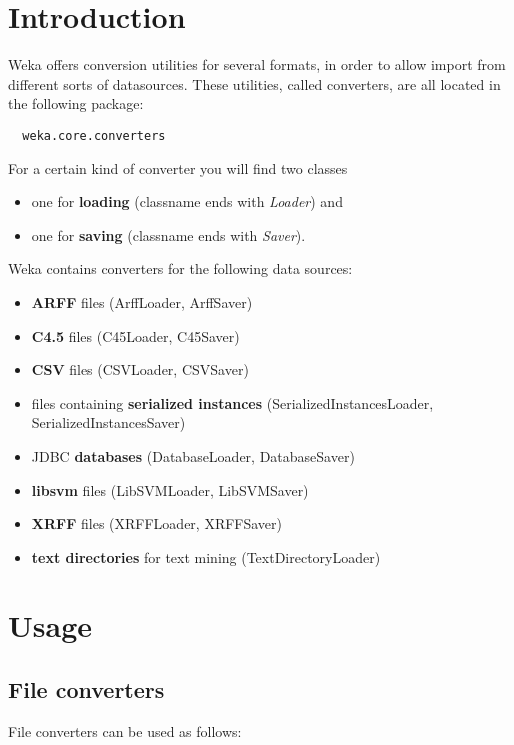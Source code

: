 
\section{Introduction}
Weka offers conversion utilities for several formats, in order to allow import from different sorts of datasources. These utilities, called converters, are all located in the following package:

\begin{verbatim}
  weka.core.converters
\end{verbatim}

\noindent For a certain kind of converter you will find two classes

\begin{itemize}
	\item one for \textbf{loading} (classname ends with \textit{Loader}) and
	\item one for \textbf{saving} (classname ends with \textit{Saver}).
\end{itemize}

\noindent Weka contains converters for the following data sources:

\begin{itemize}
	\item \textbf{ARFF} files (ArffLoader, ArffSaver)
	\item \textbf{C4.5} files (C45Loader, C45Saver)
	\item \textbf{CSV} files (CSVLoader, CSVSaver)
	\item files containing \textbf{serialized instances} (SerializedInstancesLoader, SerializedInstancesSaver)
	\item JDBC \textbf{databases} (DatabaseLoader, DatabaseSaver)
	\item \textbf{libsvm} files (LibSVMLoader, LibSVMSaver)
	\item \textbf{XRFF} files (XRFFLoader, XRFFSaver)
	\item \textbf{text directories} for text mining (TextDirectoryLoader)
\end{itemize}

\section{Usage}

\subsection{File converters}
File converters can be used as follows:

